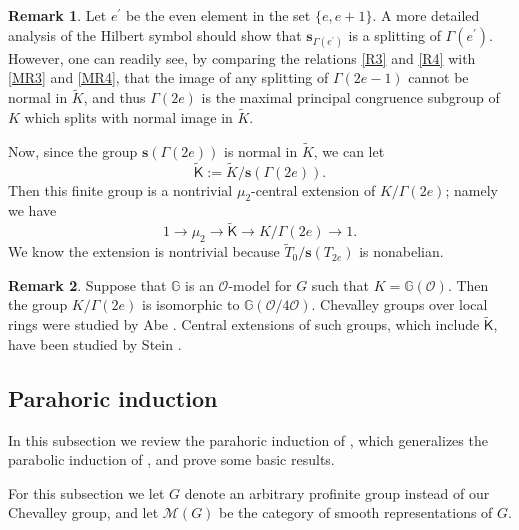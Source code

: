 \documentclass[10pt, letterpaper]{amsart}
\theoremstyle{plain}
\theoremstyle{definition}
\newtheorem*{Rmk}{Remark}
\numberwithin{equation}{section}
\newcommand{\Kt}{\widetilde{K}}
\newcommand{\Tt}{\widetilde{T}}
\newcommand{\s}{\mathbf{s}}
\newcommand{\Ocal}{\mathcal{O}}
\newcommand{\Kf}{\mathsf{K}}
\begin{document}
\begin{Rmk}\label{R:Gamma(2e)_is_max} Let $e^{\prime}$ be the even element in the set $\{e,e+1\}$. A more detailed analysis of the Hilbert symbol should show that $\s_{\Gamma(e^{\prime})}$ is a splitting of $\Gamma(e^{\prime})$. However, one can readily see, by comparing the relations \eqref{R3} and \eqref{R4} with \eqref{MR3} and \eqref{MR4}, that  the image of any splitting of $\Gamma(2e-1)$ cannot be normal in $\Kt$, and thus $\Gamma(2e)$ is the maximal principal congruence subgroup of $K$ which splits with normal image in $\Kt$.
\end{Rmk}

Now, since the group $\s(\Gamma(2e))$ is normal in $\Kt$, we can let
\begin{equation}\label{E:def_finite_K_tilde}
\widetilde{{\Kf}}:=\Kt/\s(\Gamma(2e)).
\end{equation}
Then this finite group is a nontrivial $\mu_{2}$-central extension of $K/\Gamma(2e)$; namely we have
\begin{equation}\label{Mod4CExt}
	1\rightarrow \mu_{2}\rightarrow \widetilde{{\Kf}}\rightarrow K/\Gamma(2e) \rightarrow 1.
\end{equation}
We know the extension is nontrivial because $\Tt_{0}/\s(T_{2e})$ is nonabelian.

\begin{Rmk} Suppose that $\mathbb{G}$ is an $\Ocal$-model for $G$ such that $K=\mathbb{G}(\Ocal)$. Then the group $K/\Gamma(2e)$ is isomorphic to $\mathbb{G}(\Ocal/4\Ocal)$. Chevalley groups over local rings were studied by Abe \cite{A69}. Central extensions of such groups, which include $\widetilde{{\Kf}}$, have been studied by Stein \cite{S73}.
\end{Rmk}




\subsection{Parahoric induction}\label{SS:ParaInd}


In this subsection we review the parahoric induction of \cite{CMO19}, which generalizes the parabolic induction of \cite{D09}, and prove some basic results.

For this subsection we let $G$ denote an arbitrary profinite group instead of our Chevalley group, and let $\mathcal{M}(G)$ be the category of smooth representations of $G$.
\end{document}
